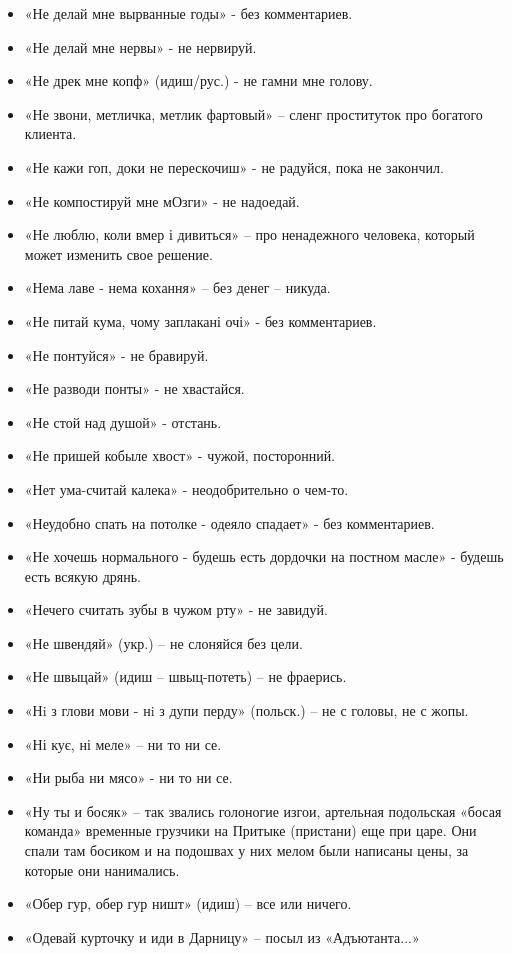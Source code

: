 \begin{itemize}
\item  «Не делай мне вырванные годы» - без комментариев. 
\item  «Не делай мне нервы» - не нервируй.
\item  «Не дрек мне копф» (идиш/рус.) - не гамни мне голову. 
\item  «Не звони, метличка, метлик фартовый» – сленг проституток про богатого 
клиента.
\item  «Не кажи гоп, доки не перескочиш» - не радуйся, пока не закончил.
\item  «Не компостируй мне мОзги» - не надоедай.
\item  «Не люблю, коли вмер і дивиться» – про ненадежного человека, который может изменить свое решение.
\item  «Нема лаве - нема кохання» – без денег – никуда.
\item  «Не питай кума, чому заплакані очі» - без комментариев.
\item  «Не понтуйся» - не бравируй.
\item  «Не разводи понты» - не хвастайся.
\item  «Не стой над душой» - отстань.
\item  «Не пришей кобыле хвост» - чужой, посторонний.
\item  «Нет ума-считай калека» - неодобрительно о чем-то.
\item  «Неудобно спать на потолке - одеяло спадает» - без комментариев.
\item  «Не хочешь нормального - будешь есть дордочки на постном масле» - будешь есть всякую дрянь.
\item  «Нечего считать зубы в чужом рту» - не завидуй.
\item  «Не швендяй» (укр.) – не слоняйся без цели.
\item  «Не швыцай» (идиш – швыц-потеть) – не фраерись.
\item  «Нi з глови мови - нi з дупи перду»  (польск.) – не с головы, не с жопы.
\item  «Ні кує, ні меле» – ни то ни се. 
\item  «Ни рыба ни мясо» - ни то ни се.
\item  «Ну ты и босяк» – так звались голоногие изгои, артельная подольская «босая команда» временные грузчики на Притыке (пристани) еще при царе. Они спали там босиком и на подошвах у них мелом были написаны цены, за которые они нанимались.
\item  «Обер гур, обер гур ништ»  (идиш) – все или ничего.
\item  «Одевай курточку и иди в Дарницу» –  посыл из «Адъютанта...»

\end{itemize}
